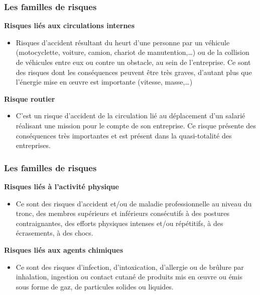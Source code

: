 \documentclass{beamer}
\begin{document}
\begin{frame}
\frametitle{Les familles de risques}

\textbf{Risques liés aux circulations internes}
\begin{itemize}
\item Risques d’accident résultant du heurt d’une personne par un véhicule (motocyclette, voiture, camion, chariot de manutention,…) ou de la collision de véhicules entre eux ou contre un obstacle, au sein de l’entreprise. Ce sont des risques dont les conséquences peuvent être très graves, d’autant plus que l’énergie mise en œuvre est importante (vitesse, masse,…)
\end{itemize}
\textbf{Risque routier}
\begin{itemize}
\item C’est un risque d’accident de la circulation lié au déplacement d’un salarié réalisant une mission pour le compte de son entreprise. Ce risque présente des conséquences très importantes et est présent dans la quasi-totalité des entreprises.
\end{itemize}
\end{frame}

\begin{frame}
\frametitle{Les familles de risques}

\textbf{Risques liés à l’activité physique}
\begin{itemize}
\item  Ce sont des risques d’accident et/ou de maladie professionnelle au niveau du tronc, des membres supérieurs et inférieurs consécutifs à des postures contraignantes, des efforts physiques intenses et/ou répétitifs, à des écrasements, à des chocs.
\end{itemize}
\textbf{Risques liés aux agents chimiques}
\begin{itemize}
\item Ce sont des risques d’infection, d’intoxication, d’allergie ou de brûlure par inhalation, ingestion ou contact cutané de produits mis en œuvre ou émis sous forme de gaz, de particules solides ou liquides.
\end{itemize}
\end{frame}
\end{document}
